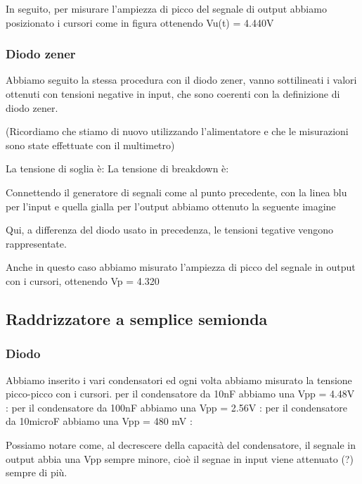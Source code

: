 \documentclass[a4paper]{article}
\begin{document}
{{			In seguito, per misurare l'ampiezza di picco del segnale di output abbiamo posizionato i cursori come in figura ottenendo Vu(t) = 4.440V %
			
			\subsubsection{Diodo zener}
			Abbiamo seguito la stessa procedura con il diodo zener, vanno sottilineati i valori ottenuti con tensioni negative in input, che sono coerenti con la definizione di diodo zener.

			(Ricordiamo che stiamo di nuovo utilizzando l'alimentatore e che le misurazioni sono state effettuate con il multimetro)

		La tensione di soglia è: 
		La tensione di breakdown è:
		
		Connettendo il generatore di segnali come al punto precedente, con la linea blu per l'input e quella gialla per l'output abbiamo ottenuto la seguente imagine
		
		Qui, a differenza del diodo usato in precedenza, le tensioni tegative vengono rappresentate.		
		
		Anche in questo caso abbiamo misurato l'ampiezza di picco del segnale in output con i cursori, ottenendo Vp = 4.320 %
		
		\subsection{Raddrizzatore a semplice semionda}
			\subsubsection{Diodo}
				Abbiamo inserito i vari condensatori ed ogni volta abbiamo misurato la tensione picco-picco con i cursori.
				per il condensatore da 10nF abbiamo una Vpp = 4.48V :
				per il condensatore da 100nF abbiamo una Vpp = 2.56V :
				per il condensatore da 10microF abbiamo una Vpp = 480 mV :
				
				Possiamo notare come, al decrescere della capacità del condensatore, il segnale in output abbia una Vpp sempre minore, cioè il segnae in input viene attenuato (?) sempre di più.
}}
\end{document}
